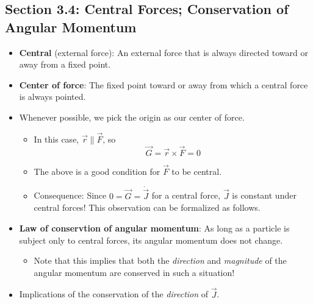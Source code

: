 \documentclass[../notes.tex]{subfiles}
\begin{document}
\subsection*{Section 3.4: Central Forces; Conservation of Angular Momentum}
\begin{itemize}
    \item \textbf{Central} (external force): An external force that is always directed toward or away from a fixed point.
    \item \textbf{Center of force}: The fixed point toward or away from which a central force is always pointed.
    \item Whenever possible, we pick the origin as our center of force.
    \begin{itemize}
        \item In this case, $\vec{r}\parallel\vec{F}$, so
        \begin{equation*}
            \vec{G} = \vec{r}\times\vec{F} = 0
        \end{equation*}
        \item The above is a good condition for $\vec{F}$ to be central.
        \item Consequence: Since $0=\vec{G}=\dot{\vec{J}}$ for a central force, $\vec{J}$ is constant under central forces! This observation can be formalized as follows.
    \end{itemize}
    \item \textbf{Law of conservtion of angular momentum}: As long as a particle is subject only to central forces, its angular momentum does not change.
    \begin{itemize}
        \item Note that this implies that both the \emph{direction} and \emph{magnitude} of the angular momentum are conserved in such a situation!
    \end{itemize}
    \item Implications of the conservation of the \emph{direction} of $\vec{J}$.
    \begin{figure}[h!]
        \centering
\end{figure}
\end{itemize}
\end{document}
